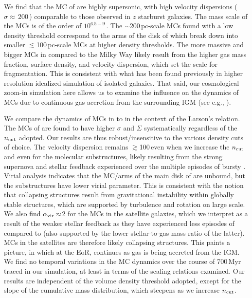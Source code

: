 \IfFileExists{emulateapjlegacy.cls}{\documentclass[iop]{emulateapjlegacy}}{\documentclass[iop]{emulateapj}}
\begin{document}
We find that the MC of \flower are highly supersonic, with high velocity dispersions ($\sigma\approx$\,200\,\kms) comparable to 
those observed in $z$ starburst galaxies.
The mass scale of the MCs is of the order of $10^{6.5-9}$\,\Msun. The $\sim$200\,pc-scale MCs found with a low density threshold 
correspond to the arms of the disk of \flower which break down into smaller $\lesssim$100\,pc-scale MCs at higher density thresholds. 
The more massive and bigger MCs in \flower compared to the Milky Way 
likely result from the higher gas mass fraction, surface density, and velocity dispersion, 
which set the scale for fragmentation.
This is consistent with what has been found previously in higher resolution idealized simulation of isolated galaxies.
That said, our cosmological zoom-in simulation here allows us to examine 
the influence on the dynamics of MCs due to continuous gas accretion from the surrounding IGM (see e.g., \citealt{Klessen10a, Goldbaum11a}).

We compare the dynamics of MCs in \flower to \obs in the context of the Larson's relation.
The MCs of \flower are found to have higher $\sigma$ and $\Sigma$ systematically regardless of the $n_{\rm cut}$ adopted.
Our results are thus robust/insensitive to the various density cuts of choice.
The velocity dispersion remains $\gtrsim$100\,\kms even when we increase the $n_{\rm cut}$ and even for  
the molecular substructures, likely resulting from 
the strong supernova and stellar feedback \flower experienced over the multiple episodes of bursty \SF.
Virial analysis indicates that the MC/arms of the main disk of \flower are unbound, but the substructures have lower virial parameter. 
This is consistent with the notion that collapsing structures result from gravitational instability within globally stable structures, which are 
supported by turbulence and rotation on large scale.
We also find $\alpha_{\rm vir}\approx$2 for the MCs in the satellite galaxies, which we interpret as a result of the weaker stellar feedback as they have
experienced less episodes of \SF compared to \flower (also supported by the lower stellar-to-gas mass ratio of the latter).
MCs in the satellites are therefore likely collapsing structures. This paints a picture, in which at the EoR, \SF continues 
as gas is being accreted from the IGM.
We find no temporal variations in the MC dynamics over the course of 700\,Myr traced in our simulation, at least in terms of the scaling relations examined. 
Our results are independent of the volume density threshold adopted, except for the slope of the cumulative 
mass distribution, which steepens as we increase $n_{\rm cut}$. 
\end{document}
